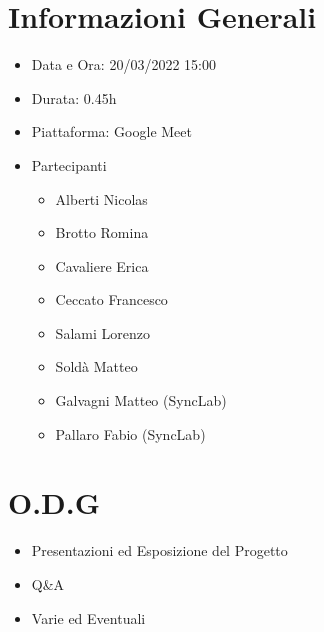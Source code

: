 \documentclass[a4paper, 12pt]{article}
\begin{document}
\makefrontpage
\section*{Informazioni Generali}
\begin{itemize}
    \item Data e Ora: 20/03/2022 15:00
    \item Durata: 0.45h
    \item Piattaforma: Google Meet
    \item Partecipanti
    \begin{itemize}
        \item Alberti Nicolas
        \item Brotto Romina
        \item Cavaliere Erica
        \item Ceccato Francesco
        \item Salami Lorenzo
        \item Soldà Matteo
        \item Galvagni Matteo (SyncLab)
        \item Pallaro Fabio (SyncLab)
    \end{itemize}
\end{itemize}
\section*{O.D.G}
\begin{itemize}
    \item Presentazioni ed Esposizione del Progetto
    \item Q\&A
    \item Varie ed Eventuali
\end{itemize}
\end{document}
